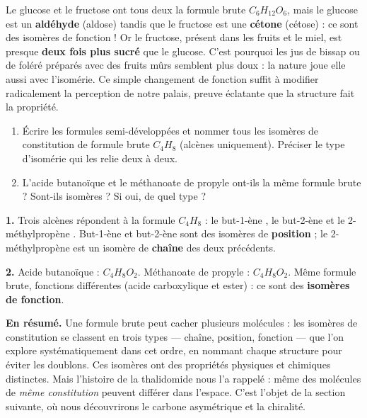 \documentclass[11pt]{article}
\begin{document}
\begin{savaistu}
Le glucose et le fructose ont tous deux la formule brute $C_6H_{12}O_6$, mais le glucose est un \textbf{aldéhyde} (aldose) tandis que le fructose est une \textbf{cétone} (cétose) : ce sont des isomères de fonction ! Or le fructose, présent dans les fruits et le miel, est presque \textbf{deux fois plus sucré} que le glucose. C'est pourquoi les jus de bissap ou de foléré préparés avec des fruits mûrs semblent plus doux : la nature joue elle aussi avec l'isomérie. Ce simple changement de fonction suffit à modifier radicalement la perception de notre palais, preuve éclatante que la structure fait la propriété.
\end{savaistu}

\begin{exercice}
\begin{enumerate}
\item Écrire les formules semi-développées et nommer tous les isomères de constitution de formule brute $C_4H_8$ (alcènes uniquement). Préciser le type d'isomérie qui les relie deux à deux.
\item L'acide butanoïque et le méthanoate de propyle ont-ils la même formule brute ? Sont-ils isomères ? Si oui, de quel type ?
\end{enumerate}
\end{exercice}

\begin{corrige}[Exercice]
\textbf{1.} Trois alcènes répondent à la formule $C_4H_8$ : le but-1-ène , le but-2-ène  et le 2-méthylpropène . But-1-ène et but-2-ène sont des isomères de \textbf{position} ; le 2-méthylpropène est un isomère de \textbf{chaîne} des deux précédents.

\textbf{2.} Acide butanoïque  : $C_4H_8O_2$. Méthanoate de propyle  : $C_4H_8O_2$. Même formule brute, fonctions différentes (acide carboxylique et ester) : ce sont des \textbf{isomères de fonction}.
\end{corrige}

\textbf{En résumé.} Une formule brute peut cacher plusieurs molécules : les isomères de constitution se classent en trois types — chaîne, position, fonction — que l'on explore systématiquement dans cet ordre, en nommant chaque structure pour éviter les doublons. Ces isomères ont des propriétés physiques et chimiques distinctes. Mais l'histoire de la thalidomide nous l'a rappelé : même des molécules de \emph{même constitution} peuvent différer dans l'espace. C'est l'objet de la section suivante, où nous découvrirons le carbone asymétrique et la chiralité.
\end{document}
